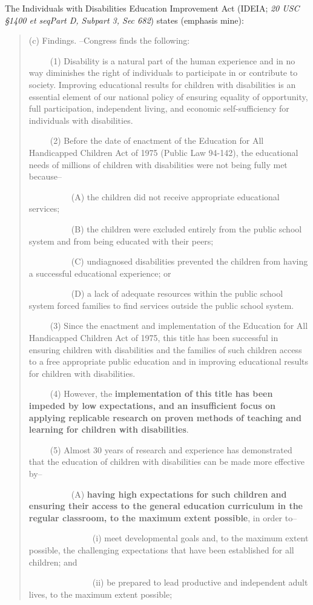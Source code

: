 \documentclass[twoside]{article}
\begin{document}
The Individuals with Disabilities Education Improvement Act (IDEIA; \textit{20 USC §1400 et seqPart D, Subpart 3, Sec 682}) states (emphasis mine):
\begin{quotation}
(c) Findings. --Congress finds the following:

~~~~~(1) Disability is a natural part of the human experience and in no way diminishes the right of individuals to participate in or contribute to society. Improving educational results for children with disabilities is an essential element of our national policy of ensuring equality of opportunity, full participation, independent living, and economic self-sufficiency for individuals with disabilities.

~~~~~(2) Before the date of enactment of the Education for All Handicapped Children Act of 1975 (Public Law 94-142), the educational needs of millions of children with disabilities were not being fully met because--

~~~~~~~~~~(A) the children did not receive appropriate educational services;

~~~~~~~~~~(B) the children were excluded entirely from the public school system and from being educated with their peers;

~~~~~~~~~~(C) undiagnosed disabilities prevented the children from having a successful educational experience; or

~~~~~~~~~~(D) a lack of adequate resources within the public school system forced families to find services outside the public school system.

~~~~~(3) Since the enactment and implementation of the Education for All Handicapped Children Act of 1975, this title has been successful in ensuring children with disabilities and the families of such children access to a free appropriate public education and in improving educational results for children with disabilities.

~~~~~(4) However, the \textbf{implementation of this title has been impeded by low expectations, and an insufficient focus on applying replicable research on proven methods of teaching and learning for children with disabilities}.

~~~~~(5) Almost 30 years of research and experience has demonstrated that the education of children with disabilities can be made more effective by--

~~~~~~~~~~(A) \textbf{having high expectations for such children and ensuring their access to the general education curriculum in the regular classroom, to the maximum extent possible}, in order to--

~~~~~~~~~~~~~~~(i) meet developmental goals and, to the maximum extent possible, the challenging expectations that have been established for all children; and

~~~~~~~~~~~~~~~(ii) be prepared to lead productive and independent adult lives, to the maximum extent possible;
\end{quotation}
\end{document}

